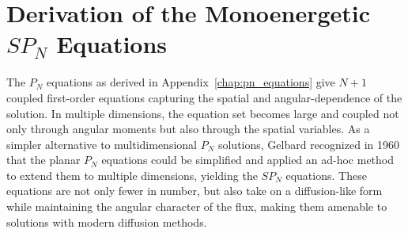 \section{Derivation of the Monoenergetic $SP_N$ Equations}
\label{sec:spn_equations}
The $P_N$ equations as derived in Appendix~\ref{chap:pn_equations}
give $N+1$ coupled first-order equations capturing the spatial and
angular-dependence of the solution. In multiple dimensions, the
equation set becomes large and coupled not only through angular
moments but also through the spatial variables. As a simpler
alternative to multidimensional $P_N$ solutions, Gelbard recognized in
1960 that the planar $P_N$ equations could be simplified and applied
an ad-hoc method to extend them to multiple dimensions, yielding the
$SP_N$ equations. These equations are not only fewer in number, but
also take on a diffusion-like form while maintaining the angular
character of the flux, making them amenable to solutions with modern
diffusion methods.

